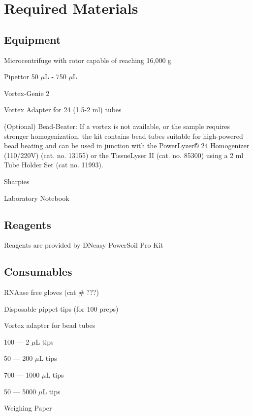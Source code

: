 \documentclass[12pt]{SOP5_beta}\usepackage[]{graphicx}\usepackage[]{xcolor}
\begin{document}
\section{Required Materials}

\subsection*{Equipment}

\NP Microcentrifuge with rotor capable of reaching 16,000 g

\NP Pipettor 50 $\mu$L - 750 $\mu$L

\NP Vortex-Genie 2

\NP Vortex Adapter for 24 (1.5-2 ml) tubes

\NP (Optional) Bead-Beater: If a vortex is not available, or the sample requires stronger homogenization, the kit contains bead tubes suitable for high-powered bead beating and can be used in junction with the PowerLyzer® 24 Homogenizer (110/220V) (cat. no. 13155) or the TissueLyser II (cat. no. 85300) using a 2 ml Tube Holder Set (cat no. 11993).

\NP Sharpies

\NP Laboratory Notebook

\subsection*{Reagents}

\NP Reagents are provided by DNeasy PowerSoil Pro Kit 

\subsection*{Consumables}

\NP RNAase free gloves (cat \# ???)

\NP Disposable pippet tips (for 100 preps) 

\NP Vortex adapter for bead tubes

\begin{itemize*}
  \item 100 --- 2 $\mu$L tips
  \item 50 --- 200 $\mu$L tips
  \item 700 --- 1000 $\mu$L tips
  \item 50 --- 5000 $\mu$L tips

\end{itemize*}

\NP Weighing Paper
\end{document}
